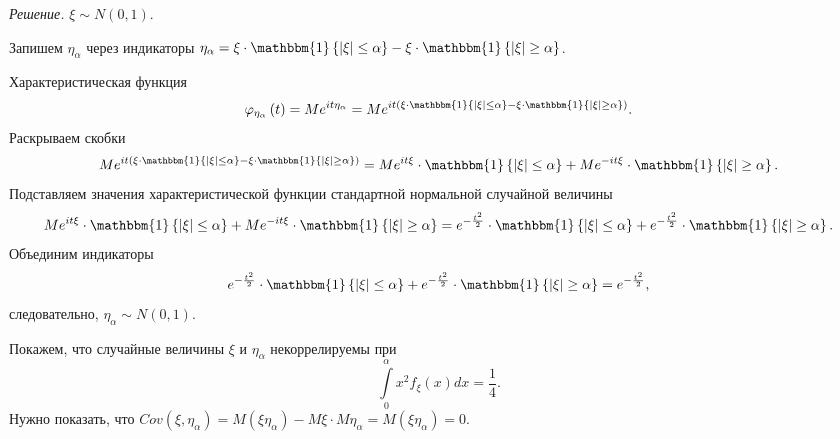 \textit{Решение.} $ \xi \sim N \left( 0, 1 \right) $.

Запишем $ \eta_{ \alpha }$ через индикаторы
$ \eta_{ \alpha } =
  \xi \cdot \mathbbm{1} \left\{ \left| \xi \right| \leq \alpha \right\} -
  \xi \cdot \mathbbm{1} \left\{ \left| \xi \right| \geq \alpha \right\} $.

Характеристическая функция
$$ \varphi_{ \eta_{ \alpha }} \left( t \right) =
  Me^{it \eta_{ \alpha }} =
  Me^{it \left( \xi \cdot \mathbbm{1} \left\{ \left| \xi \right| \leq \alpha \right\} - \xi \cdot \mathbbm{1} \left\{ \left| \xi \right| \geq \alpha \right\} \right) }.$$
Раскрываем скобки
$$Me^{it \left( \xi \cdot \mathbbm{1} \left\{ \left| \xi \right| \leq \alpha \right\} - \xi \cdot \mathbbm{1} \left\{ \left| \xi \right| \geq \alpha \right\} \right) } =
  Me^{it \xi } \cdot \mathbbm{1} \left\{ \left| \xi \right| \leq \alpha \right\} +
  Me^{-it \xi } \cdot \mathbbm{1} \left\{ \left| \xi \right| \geq \alpha \right\}.$$
Подставляем значения характеристической функции стандартной нормальной случайной величины
$$Me^{it \xi } \cdot \mathbbm{1} \left\{ \left| \xi \right| \leq \alpha \right\} +
  Me^{-it \xi } \cdot \mathbbm{1} \left\{ \left| \xi \right| \geq \alpha \right\} =
  e^{- \frac{t^2}{2}} \cdot \mathbbm{1} \left\{ \left| \xi \right| \leq \alpha \right\} +
  e^{- \frac{t^2}{2}} \cdot \mathbbm{1} \left\{ \left| \xi \right| \geq \alpha \right\}.$$
Объединим индикаторы
$$e^{- \frac{t^2}{2}} \cdot \mathbbm{1} \left\{ \left| \xi \right| \leq \alpha \right\} +
  e^{- \frac{t^2}{2}} \cdot \mathbbm{1} \left\{ \left| \xi \right| \geq \alpha \right\} =
  e^{- \frac{t^2}{2}},$$
следовательно, $ \eta_{ \alpha } \sim N \left( 0, 1 \right) $.

Покажем, что случайные величины $ \xi $ и $ \eta_{ \alpha }$ некоррелируемы при
$$ \int \limits_0^{ \alpha } x^2 f_{ \xi } \left( x \right) dx =
  \frac{1}{4}.$$
Нужно показать,
что
$Cov \left( \xi, \eta_{ \alpha } \right) =
  M \left( \xi \eta_{ \alpha } \right) - M \xi \cdot M \eta_{ \alpha } =
  M \left( \xi \eta_{ \alpha } \right) =
  0$.

